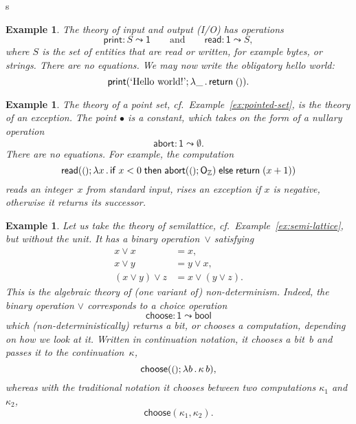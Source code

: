 s\documentclass{amsart}
\newcommand{\ZZ}{\mathbb{Z}} %
\newcommand{\lam}[1]{\lambda #1 \,.\,}
\newcommand{\opdecl}[3]{#1 : #2 \leadsto #3} %
\newcommand{\one}{\mathsf{1}} %
\newcommand{\unit}{{\text{\small$()$}}} %
\newcommand{\bool}{\mathsf{bool}} %
\newcommand{\cond}[3]{\mathsf{if}\;#1\;\mathsf{then}\;#2\;\mathsf{else}\;#3}
\newcommand{\kode}[1]{\mathsf{#1}}
\newcommand{\opcall}[3]{\kode{#1}(#2; #3)}
\newcommand{\return}[1]{\kode{return}\;#1}
\newtheorem{example}[definition]{Example}
\begin{document}
\begin{example}
  \label{ex:theory-io}
  The theory of \emph{input and output} (I/O) has operations
  \begin{equation*}
    \opdecl{\kode{print}}{S}{\one}
    \qquad\text{and}\qquad
    \opdecl{\kode{read}}{\one}{S},
  \end{equation*}
  where $S$ is the set of entities that are read or written, for example bytes,
  or strings. There are no equations. We may now write the obligatory hello world:
  \begin{equation*}
    \opcall{print}{\text{`Hello world!'}}{\lam{\_} \return{\unit}}.
  \end{equation*}
\end{example}

\begin{example}
  \label{ex:theory-exception}
  The theory of a point set, cf.\ Example~\ref{ex:pointed-set}, is the theory of
  an \emph{exception}. The point $\bullet$ is a constant, which takes on the
  form of a nullary operation
  \begin{equation*}
    \opdecl{\kode{abort}}{\one}{\emptyset}.
  \end{equation*}
  There are no equations. For example, the computation
  \begin{equation*}
    \opcall{read}{\unit}{
      \lam{x}{
        \cond{x < 0}{\opcall{abort}{\unit}{\mathsf{O}_\ZZ}}{\return{(x+1)}}
      }
    }
  \end{equation*}
  reads an integer~$x$ from standard input, rises an exception if $x$ is
  negative, otherwise it returns its successor.
\end{example}

\begin{example}
  Let us take the theory of semilattice, cf.\ Example~\ref{ex:semi-lattice}, but without the
  unit. It has a binary operation~$\vee$ satisfying
  \begin{align*}
    x \vee x &= x, \\
    x \vee y &= y \vee x, \\
    (x \vee y) \vee z &= x \vee (y \vee z).
  \end{align*}
  This is the algebraic theory of (one variant of) \emph{non-determinism}.
  Indeed, the binary operation $\vee$ corresponds to a choice operation
  \begin{equation*}
    \opdecl{\kode{choose}}{\one}{\bool}
  \end{equation*}
  which (non-deterministically) returns a bit, or chooses a computation, depending
  on how we look at it. Written in continuation notation, it chooses a bit~$b$
  and passes it to the continuation~$\kappa$,
  \begin{equation*}
    \opcall{choose}{\unit}{\lam{b}{\kappa \, b}},
  \end{equation*}
  whereas with the traditional notation it chooses between two computations
  $\kappa_1$ and $\kappa_2$,
  \begin{equation*}
    \kode{choose}(\kappa_1, \kappa_2).
  \end{equation*}
\end{example}
\end{document}
